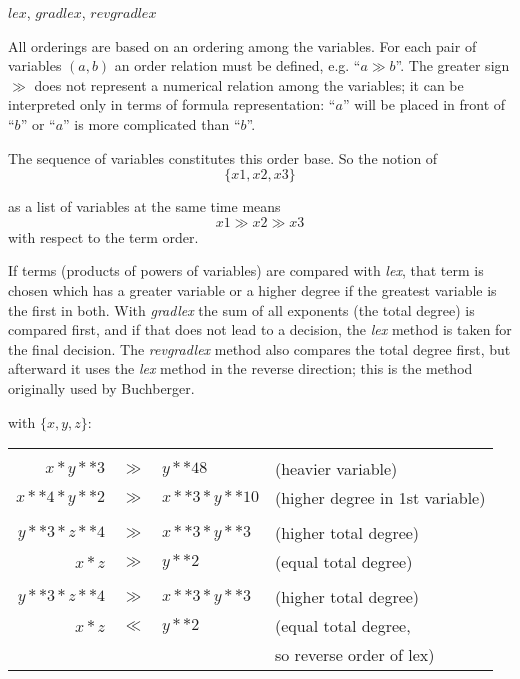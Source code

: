 \begin{center}
$lex$, $gradlex$, $revgradlex$
\end{center}

All orderings are based on an ordering among the variables. For
each pair of variables $(a,b)$ an order relation must be defined, e.g.
``$ a\gg b $''. The greater sign $\gg$  does not represent a numerical
relation among the variables; it can be interpreted only in terms of
formula representation: ``$a$'' will be placed in front of ``$b$'' or
``$a$''  is more complicated than ``$b$''.

The sequence of variables constitutes this order base. So the notion
of
\[ \{x1,x2,x3\} \]

as a list of variables at the same time means
\[ x1 \gg x2 \gg x3 \]
with respect to the term order.

If terms (products of powers of variables) are compared with \emph{lex},
that term is chosen which has a greater variable or a higher degree
if the greatest variable is the first in both. With \emph{gradlex} the sum of
all exponents (the total degree) is compared first, and if that does
not lead to a decision, the \emph{lex} method is taken for the final decision.
The \emph{revgradlex} method also compares the total degree first, but
afterward it uses the \emph{lex} method in the reverse direction; this is the
method originally used by Buchberger.

\example{} with $\{x,y,z\}$: 

\begin{center}
\begin{tabular}{@{}rlll}
  \multicolumn{2}{l}{\hspace*{-1cm}{\bf lex:}} \\
  $x * y**3$    & $\gg$ & $y**48$ & (heavier variable) \\
  $x**4 * y**2$ & $\gg$ & $x**3 * y**10$ & (higher degree in 1st variable) \\[2mm]
  \multicolumn{2}{l}{\hspace*{-1cm}{\bf gradlex:}} \\
  $y**3 * z**4$ & $\gg$ & $x**3 * y**3$ & (higher total degree) \\
  $x*z$         & $\gg$ & $y**2$ & (equal total degree) \\[2mm]
  \multicolumn{2}{l}{\hspace*{-1cm}{\bf revgradlex:}} \\
  $y**3 * z**4$ & $\gg$ & $x**3 * y**3$ & (higher total degree) \\
  $x*z$         & $\ll$ & $y**2$ & (equal total degree, \\
                &       &        & so reverse order of lex)
\end{tabular}
\end{center}

